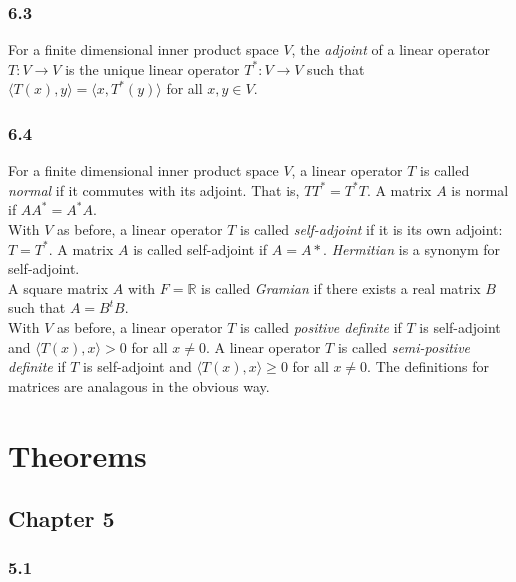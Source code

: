 \documentclass{article}
\begin{document}
\subsubsection*{6.3}

For a finite dimensional inner product space $V$, the \textit{adjoint} of a linear operator $T: V \to V$ is the unique linear operator $T^*: V \to V$ such that $\langle T(x), y \rangle = \langle x, T^*(y) \rangle$ for all $x, y \in V$. 

\subsubsection*{6.4}

For a finite dimensional inner product space $V$, a linear operator $T$ is called \textit{normal} if it commutes with its adjoint. That is, $TT^* = T^*T$. A matrix $A$ is normal if $AA^* = A^*A$. \\

With $V$ as before, a linear operator $T$ is called \textit{self-adjoint} if it is its own adjoint: $T = T^*$. A matrix $A$ is called self-adjoint if $A=A*$. \textit{Hermitian} is a synonym for self-adjoint. \\

A square matrix $A$ with $F = \mathbb{R}$ is called \textit{Gramian} if there exists a real matrix $B$ such that $A = B^tB$. \\

With $V$ as before, a linear operator $T$ is called \textit{positive definite} if $T$ is self-adjoint and $\langle T(x), x \rangle > 0$ for all $x \neq 0$. A linear operator $T$ is called \textit{semi-positive definite} if $T$ is self-adjoint and $\langle T(x), x \rangle \geq 0$ for all $x \neq 0$. The definitions for matrices are analagous in the obvious way. 

\section{Theorems}

\subsection*{Chapter 5}



\subsubsection*{5.1}
\end{document}
